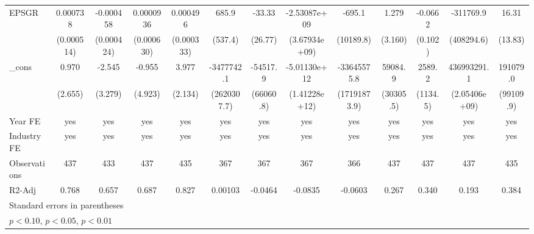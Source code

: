 \begin{table}[htbp]
\begin{tabular}{l*{12}{c}}
EPSGR               &    0.000738         &   -0.000458         &   0.0000936         &    0.000496         &       685.9         &      -33.33         &-2.53087e+09         &      -695.1         &       1.279         &     -0.0662         &   -311769.9         &       16.31         \\
                    &  (0.000514)         &  (0.000424)         &  (0.000630)         &  (0.000333)         &     (537.4)         &     (26.77)         &(3.67934e+09)         &   (10189.8)         &     (3.160)         &     (0.102)         &  (408294.6)         &     (13.83)         \\
\_cons              &       0.970         &      -2.545         &      -0.955         &       3.977\sym{*}  &  -3477742.1         &    -54517.9         &-5.01130e+12\sym{***}& -33645575.8\sym{*}  &     59084.9\sym{*}  &      2589.2\sym{**} & 436993291.1         &    191079.0\sym{*}  \\
                    &     (2.655)         &     (3.279)         &     (4.923)         &     (2.134)         & (2620307.7)         &   (66060.8)         &(1.41228e+12)         &(17191873.9)         &   (30305.5)         &    (1134.5)         &(2.05406e+09)         &   (99109.9)         \\
\hline
Year FE             &         yes         &         yes         &         yes         &         yes         &         yes         &         yes         &         yes         &         yes         &         yes         &         yes         &         yes         &         yes         \\
Industry FE         &         yes         &         yes         &         yes         &         yes         &         yes         &         yes         &         yes         &         yes         &         yes         &         yes         &         yes         &         yes         \\
Observations        &         437         &         433         &         437         &         435         &         367         &         367         &         367         &         366         &         437         &         437         &         437         &         435         \\
R2-Adj              &       0.768         &       0.657         &       0.687         &       0.827         &     0.00103         &     -0.0464         &     -0.0835         &     -0.0603         &       0.267         &       0.340         &       0.193         &       0.384         \\
\hline\hline
\multicolumn{13}{l}{\footnotesize Standard errors in parentheses}\\
\multicolumn{13}{l}{\footnotesize \sym{*} \(p<0.10\), \sym{**} \(p<0.05\), \sym{***} \(p<0.01\)}\\
\end{tabular}
\end{table}
